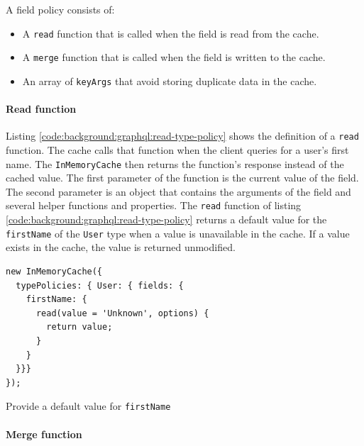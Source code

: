 \bigskip

\noindent A field policy consists of: \cite{misc:-:background:graphql:apollo-client-cache-reading-writing}

\begin{itemize}
  \item A \texttt{read} function that is called when the field is read from the cache.
  \item A \texttt{merge} function that is called when the field is written to the cache.
  \item An array of \texttt{keyArgs} that avoid storing duplicate data in the cache.
\end{itemize}

\paragraph{Read function}

Listing \ref{code:background:graphql:read-type-policy} shows the definition of a \texttt{read} function. The cache calls that function when the client queries for a user's first name. The \texttt{InMemoryCache} then returns the function's response instead of the cached value. The first parameter of the function is the current value of the field. The second parameter is an object that contains the arguments of the field and several helper functions and properties. \cite{misc:-:background:graphql:apollo-client-cache-reading-writing} The \texttt{read} function of listing \ref{code:background:graphql:read-type-policy} returns a default value for the \texttt{firstName} of the \texttt{User} type when a value is unavailable in the cache. If a value exists in the cache, the value is returned unmodified.

\ifshowListings
\begin{listing}[H]
    \begin{verbatim}
new InMemoryCache({
  typePolicies: { User: { fields: {
    firstName: {
      read(value = 'Unknown', options) {
        return value;
      }
    }
  }}}
});
    \end{verbatim}
    \caption{Provide a default value for \texttt{firstName}}\label{code:background:graphql:read-type-policy}
\end{listing}
\fi

\paragraph{Merge function}

